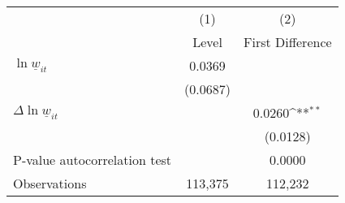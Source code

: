 {
\def\sym#1{\ifmmode^{#1}\else\(^{#1}\)\fi}
\begin{tabular}{l*{2}{c}}
\hline\hline
          &\multicolumn{1}{c}{(1)}&\multicolumn{1}{c}{(2)}\\
          &\multicolumn{1}{c}{Level}&\multicolumn{1}{c}{First Difference}\\
\hline
$\ln \underline{w}_{it}$&   0.0369         &                  \\
          & (0.0687)         &                  \\
[1em]
$\Delta \ln \underline{w}_{it}$&                  &   0.0260\sym{**} \\
          &                  & (0.0128)         \\
\hline
P-value autocorrelation test&                  &   0.0000         \\
Observations&  113,375         &  112,232         \\
\hline\hline
\end{tabular}
}
